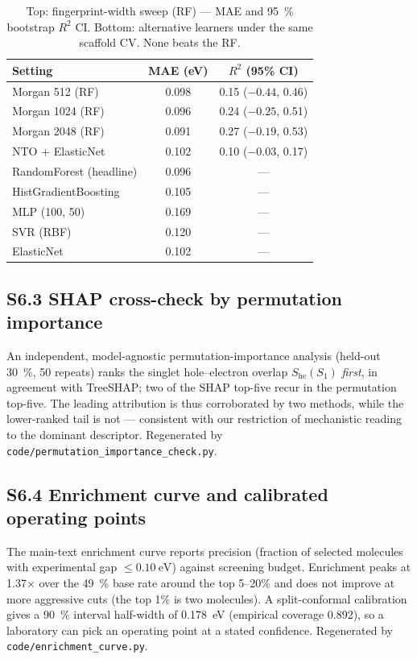 \documentclass[twoside,twocolumn,9pt]{extarticle}
\begin{document}
\begin{table}[htbp]
  \centering
  \caption{Top: fingerprint-width sweep (RF) — MAE and \qty{95}{\percent} bootstrap $R^2$
    CI. Bottom: alternative learners under the same scaffold CV. None beats the RF.}
  \label{tab:capacity}
  \footnotesize
  \begin{tabular}{lcc}
    \toprule
    Setting & MAE (eV) & $R^2$ (95\% CI) \\
    \midrule
    Morgan 512 (RF)   & 0.098 & 0.15 ($-0.44$, 0.46) \\
    Morgan 1024 (RF)  & 0.096 & 0.24 ($-0.25$, 0.51) \\
    Morgan 2048 (RF)  & 0.091 & 0.27 ($-0.19$, 0.53) \\
    NTO + ElasticNet  & 0.102 & 0.10 ($-0.03$, 0.17) \\
    \midrule
    RandomForest (headline) & 0.096 & --- \\
    HistGradientBoosting    & 0.105 & --- \\
    MLP (100, 50)           & 0.169 & --- \\
    SVR (RBF)               & 0.120 & --- \\
    ElasticNet              & 0.102 & --- \\
    \bottomrule
  \end{tabular}
\end{table}

\subsection*{S6.3 SHAP cross-check by permutation importance}
An independent, model-agnostic permutation-importance analysis (held-out \qty{30}{\percent},
\num{50} repeats) ranks the singlet hole--electron overlap $S_\text{he}(S_1)$ \emph{first},
in agreement with TreeSHAP; two of the SHAP top-five recur in the permutation top-five. The
leading attribution is thus corroborated by two methods, while the lower-ranked tail is not
--- consistent with our restriction of mechanistic reading to the dominant descriptor.
Regenerated by \texttt{code/permutation\_importance\_check.py}.

\subsection*{S6.4 Enrichment curve and calibrated operating points}
The main-text enrichment curve reports precision (fraction of selected molecules with experimental
gap $\le\qty{0.10}{\electronvolt}$) against screening budget. Enrichment peaks at
\num{1.37}$\times$ over the \qty{49}{\percent} base rate around the top \num{5}--\num{20}\%
and does not improve at more aggressive cuts (the top \num{1}\% is two molecules). A
split-conformal calibration gives a \qty{90}{\percent} interval half-width of
\qty{0.178}{\electronvolt} (empirical coverage \num{0.892}), so a laboratory can pick an
operating point at a stated confidence. Regenerated by \texttt{code/enrichment\_curve.py}.
\end{document}
